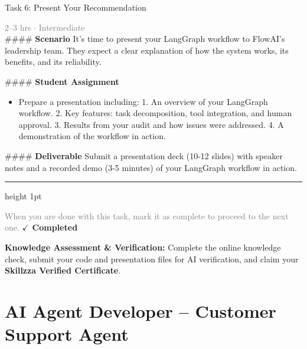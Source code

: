 \documentclass[10pt,a4paper]{article}
\begin{document}
\begin{taskbox}{Task 6: Present Your Recommendation}

    {\small \textcolor{gray}{2--3 hrs $\cdot$ Intermediate}}\\[12pt]

    \#\#\#\# \textbf{Scenario}
It’s time to present your LangGraph workflow to FlowAI’s leadership team. They expect a clear explanation of how the system works, its benefits, and its reliability.

\#\#\#\# \textbf{Student Assignment}
\begin{itemize}
    \item Prepare a presentation including:
  1. An overview of your LangGraph workflow.
  2. Key features: task decomposition, tool integration, and human approval.
  3. Results from your audit and how issues were addressed.
  4. A demonstration of the workflow in action.
\end{itemize}

\#\#\#\# \textbf{Deliverable}
Submit a presentation deck (10-12 slides) with speaker notes and a recorded demo (3-5 minutes) of your LangGraph workflow in action.\par

    \vspace{16pt}

    \textcolor{cardBorder}{\hrule height 1pt}\vspace{8pt}

    \small \textcolor{gray}{When you are done with this task, mark it as complete to proceed to the next one.} \hfill \textbf{\textcolor{brandDark}{$\checkmark$ Completed}}

\end{taskbox}

\begin{completionbox}
    \textbf{Knowledge Assessment \& Verification:} Complete the online knowledge check, submit your code and presentation files for AI verification, and claim your \textbf{Skillzza Verified Certificate}.
\end{completionbox}

\newpage




\section*{AI Agent Developer – Customer Support Agent}
\end{document}
